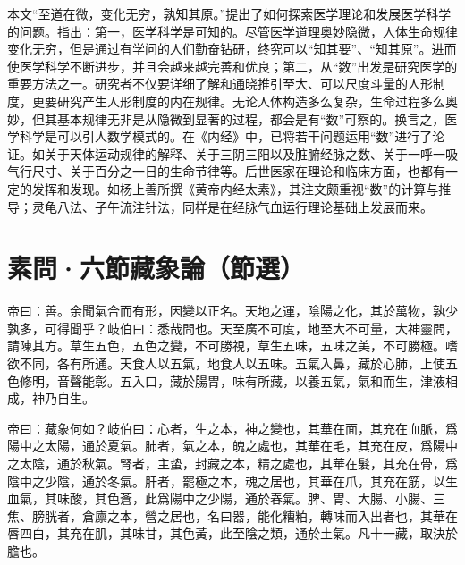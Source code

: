 \documentclass[12pt]{ctexbook}
\begin{document}


本文“至道在微，变化无穷，孰知其原。”提出了如何探索医学理论和发展医学科学的问题。指出：第一，医学科学是可知的。尽管医学道理奥妙隐微，人体生命规律变化无穷，但是通过有学问的人们勤奋钻研，终究可以“知其要”、“知其原”。进而使医学科学不断进步，并且会越来越完善和优良；第二，从“数”出发是研究医学的重要方法之一。研究者不仅要详细了解和通晓推引至大、可以尺度斗量的人形制度，更要研究产生人形制度的内在规律。无论人体构造多么复杂，生命过程多么奥妙，但其基本规律无非是从隐微到显著的过程，都会是有“数”可察的。换言之，医学科学是可以引人数学模式的。在《内经》中，已将若干问题运用“数”进行了论证。如关于天体运动规律的解释、关于三阴三阳以及脏腑经脉之数、关于一呼一吸气行尺寸、关于百分之一日的生命节律等。后世医家在理论和临床方面，也都有一定的发挥和发现。如杨上善所撰《黄帝内经太素》，其注文颇重视“数”的计算与推导；灵龟八法、子午流注针法，同样是在经脉气血运行理论基础上发展而来。

\section{素問·六節藏象論（節選）}%


\begin{yuanwen}
帝曰：善。余聞氣合而有形，因變以正名。天地之運，陰陽之化，其於萬物，孰少孰多，可得聞乎？岐伯曰：悉哉問也。天至廣不可度，地至大不可量，大神靈問，請陳其方。草生五色，五色之變，不可勝視，草生五味，五味之美，不可勝極。嗜欲不同，各有所通。天食人以五氣，地食人以五味。五氣入鼻，藏於心肺，上使五色修明，音聲能彰。五入口，藏於腸胃，味有所藏，以養五氣，氣和而生，津液相成，神乃自生。

帝曰：藏象何如？岐伯曰：心者，生之本，神之變也，其華在面，其充在血脈，爲陽中之太陽，通於夏氣。肺者，氣之本，魄之處也，其華在毛，其充在皮，爲陽中之太陰，通於秋氣。腎者，主蛰，封藏之本，精之處也，其華在髮，其充在骨，爲陰中之少陰，通於冬氣。肝者，罷極之本，魂之居也，其華在爪，其充在筋，以生血氣，其味酸，其色蒼，此爲陽中之少陽，通於春氣。脾、胃、大腸、小腸、三焦、膀胱者，倉廪之本，營之居也，名曰器，能化糟粕，轉味而入出者也，其華在唇四白，其充在肌，其味甘，其色黃，此至陰之類，通於土氣。凡十一藏，取決於膽也。
\end{yuanwen}

\end{document}
